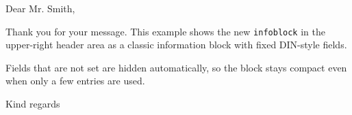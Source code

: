 \documentclass[basic, infoblock, lang=english]{../onlinebrief24}
\begin{document}
\begin{letter}{}

\opening{Dear Mr. Smith,}

Thank you for your message. This example shows the new
\texttt{infoblock} in the upper-right header area as a classic
information block with fixed DIN-style fields.

Fields that are not set are hidden automatically, so the block stays compact
even when only a few entries are used.

\closing{Kind regards}

\end{letter}
\end{document}
